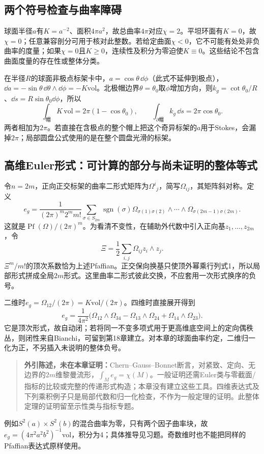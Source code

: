 \subsection*{两个符号检查与曲率障碍}
球面半径$a$有$K=a^{-2}$、面积$4\pi a^2$，故总曲率$4\pi$对应$\chi=2$。平坦环面有$K=0$，故$\chi=0$；任意兼容剖分可用于核对此整数。若给定曲面$\chi<0$，它不可能有处处非负曲率的度量；如果$\chi=0$且$K\geq0$，连续性及积分为零迫使$K\equiv0$。这些结论不包含曲面度量的存在性或整体分类。

在半径$R$的球面非极点标架卡中，$a=\cos\theta\,\dd\phi$（此式不延伸到极点），$\dd a=-\sin\theta\,\dd\theta\wedge\dd\phi=-K\mathrm{vol}$。北极帽边界$\theta=\theta_0$取$\phi$增加方向，则$k_g=\cot\theta_0/R$、$\dd s=R\sin\theta_0\dd\phi$，所以
\[
 \int_{\text{帽}}K\,\mathrm{vol}=2\pi(1-\cos\theta_0),\qquad
 \int_{\partial\text{帽}}k_g\,\dd s=2\pi\cos\theta_0.
\]
两者相加为$2\pi$。若直接在含极点的整个帽上把这个奇异标架的$a$用于Stokes，会漏掉$2\pi$；局部圆盘公式使用的是在整个圆盘光滑的标架。

\subsection*{高维Euler形式：可计算的部分与尚未证明的整体等式}
令$n=2m$，正向正交标架的曲率二形式矩阵为$\Omega^i{}_j$，简写$\Omega_{ij}$，其矩阵斜对称。定义
\[
 e_g=\frac1{(2\pi)^m2^m m!}
 \sum_{\sigma\in S_{2m}}\operatorname{sgn}(\sigma)
 \Omega_{\sigma(1)\sigma(2)}\wedge\cdots\wedge
 \Omega_{\sigma(2m-1)\sigma(2m)}.
\]
这就是$\operatorname{Pf}(\Omega)/(2\pi)^m$。为看清不变性，在辅助外代数中引入正向基$z_1,\ldots,z_{2m}$，令
\[
 \Xi=\frac12\sum_{i,j}\Omega_{ij}z_i\wedge z_j.
\]
$\Xi^m/m!$的顶次系数恰为上述Pfaffian。正交保向换基只使顶外幂乘行列式1，所以局部形式拼成全局$2m$形式。这里曲率二形式彼此交换，不应套用一次形式换序的负号。

二维时$e_g=\Omega_{12}/(2\pi)=K\mathrm{vol}/(2\pi)$。四维时直接展开得到
\[
 e_g=\frac1{4\pi^2}\bigl(\Omega_{12}\wedge\Omega_{34}
 -\Omega_{13}\wedge\Omega_{24}+\Omega_{14}\wedge\Omega_{23}\bigr).
\]
它是顶次形式，故自动闭；若将同一不变多项式用于更高维底空间上的定向偶秩丛，则闭性来自Bianchi，可留到第18章建立。对本章的球面曲率约定，二维归一化为正，不另插入未说明的整体负号。

\begin{quote}\small
\textbf{外引陈述，未在本章证明：}Chern--Gauss--Bonnet断言，对紧致、定向、无边界的$2m$维黎曼流形，$\int_Me_g=\chi(M)$。一般证明还需Euler类与零截面/指标的比较或完整的传递形式构造；本章没有建立这些工具。四维表达式及下列乘积例子只是局部代数和归一化检查，不作为一般定理的证明。此整体定理的证明留至示性类与指标专题。
\end{quote}
例如$S^2(a)\times S^2(b)$的混合曲率为零，只有两个因子曲率块，故$e_g=(4\pi^2a^2b^2)^{-1}\mathrm{vol}$，积分为4；具体推导见习题。奇数维时也不能把同样的Pfaffian表达式原样使用。
